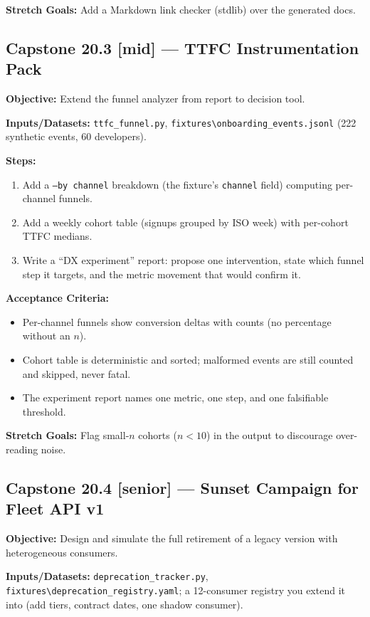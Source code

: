 \textbf{Stretch Goals:} Add a Markdown link checker (stdlib) over the
generated docs.

\subsection*{Capstone 20.3 [mid] --- TTFC Instrumentation Pack}
\textbf{Objective:} Extend the funnel analyzer from report to decision
tool.

\textbf{Inputs/Datasets:} \texttt{ttfc\_funnel.py},
\texttt{fixtures\textbackslash{}onboarding\_events.jsonl} (222 synthetic
events, 60 developers).

\textbf{Steps:}
\begin{enumerate}
  \item Add a \texttt{--by channel} breakdown (the fixture's
        \texttt{channel} field) computing per-channel funnels.
  \item Add a weekly cohort table (signups grouped by ISO week) with
        per-cohort TTFC medians.
  \item Write a ``DX experiment'' report: propose one intervention,
        state which funnel step it targets, and the metric movement that
        would confirm it.
\end{enumerate}

\textbf{Acceptance Criteria:}
\begin{itemize}
  \item[$\square$] Per-channel funnels show conversion deltas with
        counts (no percentage without an $n$).
  \item[$\square$] Cohort table is deterministic and sorted; malformed
        events are still counted and skipped, never fatal.
  \item[$\square$] The experiment report names one metric, one step, and
        one falsifiable threshold.
\end{itemize}

\textbf{Stretch Goals:} Flag small-$n$ cohorts ($n < 10$) in the output
to discourage over-reading noise.

\subsection*{Capstone 20.4 [senior] --- Sunset Campaign for Fleet API v1}
\textbf{Objective:} Design and simulate the full retirement of a legacy
version with heterogeneous consumers.

\textbf{Inputs/Datasets:} \texttt{deprecation\_tracker.py},
\texttt{fixtures\textbackslash{}deprecation\_registry.yaml}; a 12-consumer
registry you extend it into (add tiers, contract dates, one shadow
consumer).

